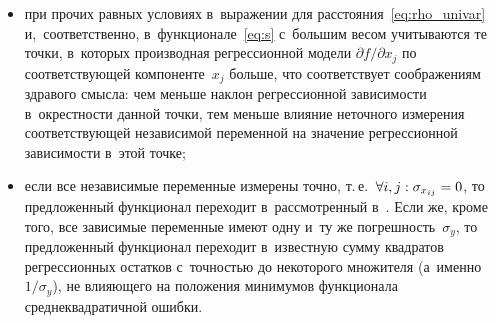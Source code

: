\begin{multicols}{2}
\begin{itemize}
  \item при прочих равных условиях в~выражении для расстояния~\eqref{eq:rho_univar} 
  и,~соответственно, в~функционале~\eqref{eq:s} с~большим весом учитываются те 
точ\-ки, в~которых производная регрессионной модели 
${\partial f}/{\partial x_j}$ по  соответствующей
    компоненте~$x_j$ больше, что соответствует соображениям здравого смысла: 
чем меньше наклон регрессионной зависимости в~окрест\-ности данной точки, тем меньше влияние 
неточного измерения соответствующей независимой переменной на значение регрессионной 
зависимости в~этой точке;

  \item если все независимые переменные измерены точно, т.\,е.\
    $\forall i, j : \sigma_{x_{ij}} \hm= 0$, то предложенный функционал переходит 
в~рассмотренный в~\cite{jukic2013nonlinear}. Если же, кроме того, все зависимые переменные 
имеют одну и~ту  же по\-греш\-ность~$\sigma_y$,
    то предложенный функционал переходит в~известную сумму квадратов 
регрессионных остатков с~точ\-ностью до некоторого множителя 
(а~именно ${1}/{\sigma_y}$), не 
влияющего на положения минимумов функционала среднеквадратичной ошибки.
\end{itemize}


\end{multicols}
